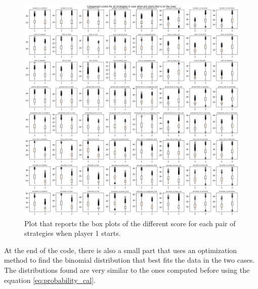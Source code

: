 \begin{figure}
    \centering
    \includegraphics[width=0.7\linewidth]{img/box_plot_starts.png}
    \caption{Plot that reports the box plots of the different score for each pair of strategies when player 1 starts.}
    \label{fig:box_starts}
\end{figure}

At the end of the code, there is also a small part that uses an optimization method to find the binomial distribution that best fits the data in the two cases. The distributions found are very similar to the ones computed before using the equation \ref{eq:probability_cal}.